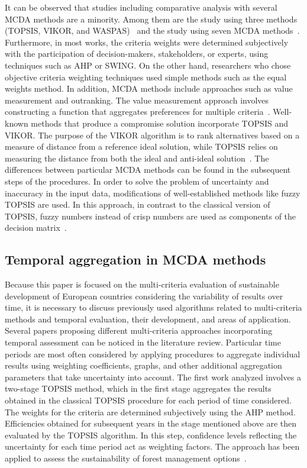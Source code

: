 \documentclass[final,5p,times,twocolumn,authoryear]{elsarticle}
\begin{document}
It can be observed that studies including comparative analysis with several MCDA methods are a minority. Among them are the study using three methods (TOPSIS, VIKOR, and WASPAS)~\citep{su2020sustainability} and the study using seven MCDA methods~\citep{sahabuddin2021multi}. Furthermore, in most works, the criteria weights were determined subjectively with the participation of decision-makers, stakeholders, or experts, using techniques such as AHP or SWING. On the other hand, researchers who chose objective criteria weighting techniques used simple methods such as the equal weights method. In addition, MCDA methods include approaches such as value measurement and outranking. The value measurement approach involves constructing a function that aggregates preferences for multiple criteria~\citep{pesce2018selecting}. Well-known methods that produce a compromise solution incorporate TOPSIS and VIKOR. The purpose of the VIKOR algorithm is to rank alternatives based on a measure of distance from a reference ideal solution, while TOPSIS relies on measuring the distance from both the ideal and anti-ideal solution~\citep{colapinto2020environmental}. The differences between particular MCDA methods can be found in the subsequent steps of the procedures. In order to solve the problem of uncertainty and inaccuracy in the input data, modifications of well-established methods like fuzzy TOPSIS are used. In this approach, in contrast to the classical version of TOPSIS, fuzzy numbers instead of crisp numbers are used as components of the decision matrix~\citep{lombardi2021multiple}.

\subsection{Temporal aggregation in MCDA methods}
\label{sec:temporalMCDA}
Because this paper is focused on the multi-criteria evaluation of sustainable development of European countries considering the variability of results over time, it is necessary to discuss previously used algorithms related to multi-criteria methods and temporal evaluation, their development, and areas of application. Several papers proposing different multi-criteria approaches incorporating temporal assessment can be noticed in the literature review. Particular time periods are most often considered by applying procedures to aggregate individual results using weighting coefficients, graphs, and other additional aggregation parameters that take uncertainty into account. The first work analyzed involves a two-stage TOPSIS method, which in the first stage aggregates the results obtained in the classical TOPSIS procedure for each period of time considered. The weights for the criteria are determined subjectively using the AHP method. Efficiencies obtained for subsequent years in the stage mentioned above are then evaluated by the TOPSIS algorithm. In this step, confidence levels reflecting the uncertainty for each time period act as weighting factors. The approach has been applied to assess the sustainability of forest management options~\citep{frini2018making}.
\end{document}
